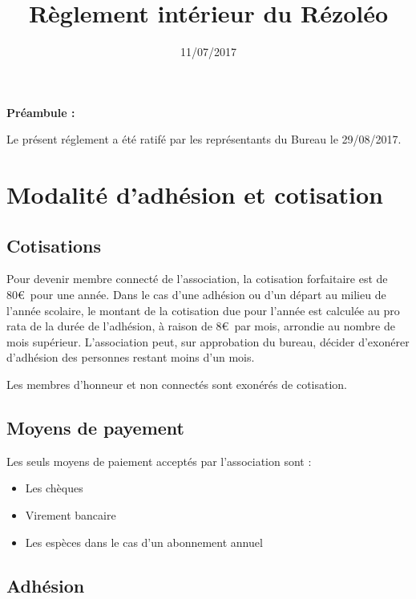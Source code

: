 \documentclass[12pt]{article}
\begin{document}
\title{Règlement intérieur du Rézoléo}
\author{}
\date{11/07/2017}
\maketitle

\textbf{\large{Préambule : \\}}

\noindent Le présent réglement a été ratifé par les représentants du Bureau le  29/08/2017.

\newpage

\tableofcontents

\newpage

\section{Modalité d'adhésion et cotisation}
	\subsection{Cotisations}

		Pour devenir membre connecté de l'association, la cotisation forfaitaire est de 80\euro \ pour une année. Dans le cas d'une adhésion ou d'un départ au milieu de l'année scolaire, le montant de la cotisation due pour l'année est calculée au pro rata de la durée de l'adhésion, à raison de 8\euro \ par mois, arrondie au nombre de mois supérieur. L'association peut, sur approbation du bureau, décider d'exonérer d'adhésion des personnes restant moins d'un mois.

		Les membres d'honneur et non connectés sont exonérés de cotisation.

    \subsection{Moyens de payement}

		Les seuls moyens de paiement acceptés par l'association sont :

			\begin{itemize}
		    	\item[\textbullet] Les chèques
		    	\item[\textbullet] Virement bancaire
			\item[\textbullet] Les espèces dans le cas d'un abonnement annuel 
		    \end{itemize}
		    

    \subsection{Adhésion}
\end{document}
